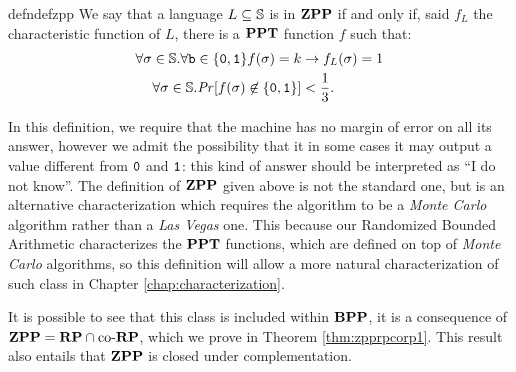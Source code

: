 \begin{restatable}{defn}{defzpp}
  \label{def:zppinformal}
We say that a language $L\subseteq \mathbb{S}$ is in $\mathbf{ZPP}$ if and only if,
said $f_L$ the characteristic function of $L$,
there is a
$\mathbf{PPT}$ function $f$ such that:
\begin{align*}
  \forall \sigma \in \mathbb{S}. \forall \mathtt{b} \in \{\mathtt{0}, \mathtt{1}\} f(\sigma)=k &\to f_L(\sigma)=1 \\
  \forall \sigma \in \mathbb{S}. \mathit{Pr}[f(\sigma)\not\in \{\mathtt{0}, \mathtt{1}\}]&< \frac 1 3.
\end{align*}
\end{restatable}
%
\noindent
In this definition, we require that the machine has no margin of error on all
its answer, however we admit the possibility that it in some cases it may output
a value different from $\mathtt{0}$ and $\mathtt{1}$: this kind of answer should be interpreted as
``I do not know''. The definition of $\mathbf{ZPP}$ given above is not the standard one, but is an alternative characterization which requires the algorithm to be a \emph{Monte Carlo} algorithm rather than a \emph{Las Vegas} one. This because our Randomized Bounded Arithmetic characterizes the $\mathbf{PPT}$ functions, which are defined on top of \emph{Monte Carlo} algorithms, so this definition will allow a more natural characterization of such class in Chapter \ref{chap:characterization}.


It is possible to see that this class is included within $\mathbf{BPP}$, it is a consequence of
$\mathbf{ZPP} = \mathbf{RP} \cap \text{co-}\mathbf{RP}$, which we prove in Theorem \ref{thm:zpprpcorp1}.
This result also entails that $\mathbf{ZPP}$ is closed under complementation.

